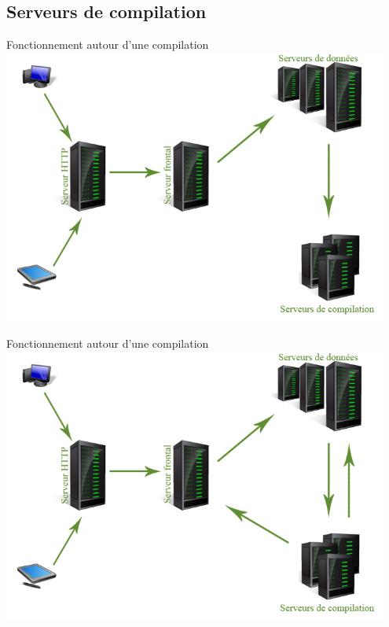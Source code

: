 \documentclass{beamer}
\begin{document}
\subsection{Serveurs de compilation}
\begin{frame}{Fonctionnement autour d'une compilation}
 	\includegraphics[width=0.95\textwidth]{./images/step7}
\end{frame}
\begin{frame}{Fonctionnement autour d'une compilation}
 	\includegraphics[width=0.95\textwidth]{./images/step8}
\end{frame}
\end{document}
